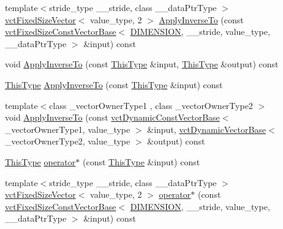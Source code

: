 \begin{DoxyCompactItemize}
\item 
{\footnotesize template$<$stride\+\_\+type \+\_\+\+\_\+stride, class \+\_\+\+\_\+data\+Ptr\+Type $>$ }\\\hyperlink{classvct_fixed_size_vector}{vct\+Fixed\+Size\+Vector}$<$ value\+\_\+type, 2 $>$ \hyperlink{classvct_matrix_rotation2_base_a5b6c786ee91bddd0e3e1f8bfc2c5aa65}{Apply\+Inverse\+To} (const \hyperlink{classvct_fixed_size_const_vector_base}{vct\+Fixed\+Size\+Const\+Vector\+Base}$<$ \hyperlink{classvct_matrix_rotation2_base_ac10279ed12ec787b1a4833ea02771348acefb9855f54f0cfd782e785c9083e592}{D\+I\+M\+E\+N\+S\+I\+O\+N}, \+\_\+\+\_\+stride, value\+\_\+type, \+\_\+\+\_\+data\+Ptr\+Type $>$ \&input) const 
\item 
void \hyperlink{classvct_matrix_rotation2_base_a393700adcf3989d073a8720b1f71088d}{Apply\+Inverse\+To} (const \hyperlink{classvct_matrix_rotation2_base_a47ffeef2ddecede4b16bcc88fb432ff5}{This\+Type} \&input, \hyperlink{classvct_matrix_rotation2_base_a47ffeef2ddecede4b16bcc88fb432ff5}{This\+Type} \&output) const 
\item 
\hyperlink{classvct_matrix_rotation2_base_a47ffeef2ddecede4b16bcc88fb432ff5}{This\+Type} \hyperlink{classvct_matrix_rotation2_base_a8034acd9e429cc58532e1e0580cb50c2}{Apply\+Inverse\+To} (const \hyperlink{classvct_matrix_rotation2_base_a47ffeef2ddecede4b16bcc88fb432ff5}{This\+Type} \&input) const 
\item 
{\footnotesize template$<$class \+\_\+vector\+Owner\+Type1 , class \+\_\+vector\+Owner\+Type2 $>$ }\\void \hyperlink{classvct_matrix_rotation2_base_abfe2d56810552dd50e40645ba903c716}{Apply\+Inverse\+To} (const \hyperlink{classvct_dynamic_const_vector_base}{vct\+Dynamic\+Const\+Vector\+Base}$<$ \+\_\+vector\+Owner\+Type1, value\+\_\+type $>$ \&input, \hyperlink{classvct_dynamic_vector_base}{vct\+Dynamic\+Vector\+Base}$<$ \+\_\+vector\+Owner\+Type2, value\+\_\+type $>$ \&output) const 
\item 
\hyperlink{classvct_matrix_rotation2_base_a47ffeef2ddecede4b16bcc88fb432ff5}{This\+Type} \hyperlink{classvct_matrix_rotation2_base_ad15b098e978e41aa3772776b7efb28d6}{operator$\ast$} (const \hyperlink{classvct_matrix_rotation2_base_a47ffeef2ddecede4b16bcc88fb432ff5}{This\+Type} \&input) const 
\item 
{\footnotesize template$<$stride\+\_\+type \+\_\+\+\_\+stride, class \+\_\+\+\_\+data\+Ptr\+Type $>$ }\\\hyperlink{classvct_fixed_size_vector}{vct\+Fixed\+Size\+Vector}$<$ value\+\_\+type, 2 $>$ \hyperlink{classvct_matrix_rotation2_base_afa6a5310f8f3b1dfd422917f81613774}{operator$\ast$} (const \hyperlink{classvct_fixed_size_const_vector_base}{vct\+Fixed\+Size\+Const\+Vector\+Base}$<$ \hyperlink{classvct_matrix_rotation2_base_ac10279ed12ec787b1a4833ea02771348acefb9855f54f0cfd782e785c9083e592}{D\+I\+M\+E\+N\+S\+I\+O\+N}, \+\_\+\+\_\+stride, value\+\_\+type, \+\_\+\+\_\+data\+Ptr\+Type $>$ \&input) const 

\end{DoxyCompactItemize}
